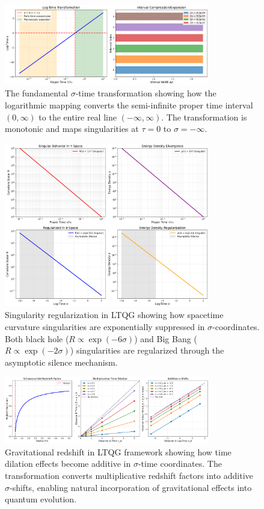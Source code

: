 \documentclass[12pt,a4paper]{article}
\begin{document}
\begin{figure}[H]
\centering
\includegraphics[width=0.8\textwidth]{figs/log_time_map.png}
\caption{The fundamental $\sigma$-time transformation showing how the logarithmic mapping converts the semi-infinite proper time interval $(0, \infty)$ to the entire real line $(-\infty, \infty)$. The transformation is monotonic and maps singularities at $\tau = 0$ to $\sigma = -\infty$.}
\label{fig:log_time_map}
\end{figure}

\begin{figure}[H]
\centering
\includegraphics[width=0.8\textwidth]{figs/singularity_regularization.png}
\caption{Singularity regularization in LTQG showing how spacetime curvature singularities are exponentially suppressed in $\sigma$-coordinates. Both black hole ($R \propto \exp(-6\sigma)$) and Big Bang ($R \propto \exp(-2\sigma)$) singularities are regularized through the asymptotic silence mechanism.}
\label{fig:singularity_regularization}
\end{figure}

\begin{figure}[H]
\centering
\includegraphics[width=0.8\textwidth]{figs/gravitational_redshift_shift.png}
\caption{Gravitational redshift in LTQG framework showing how time dilation effects become additive in $\sigma$-time coordinates. The transformation converts multiplicative redshift factors into additive $\sigma$-shifts, enabling natural incorporation of gravitational effects into quantum evolution.}
\label{fig:gravitational_redshift}
\end{figure}
\end{document}
